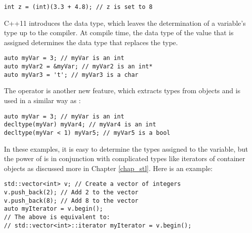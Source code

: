 \noindent\begin{minipage}{\linewidth}\begin{lstlisting}
int z = (int)(3.3 + 4.8); // z is set to 8
\end{lstlisting}\end{minipage}


C++11 introduces the  data type, which leaves the determination of a variable's type up to the compiler. 
At compile time, the data type of the value that is assigned determines the data type that replaces the  type.

\noindent\begin{minipage}{\linewidth}\begin{lstlisting}
auto myVar = 3; // myVar is an int
auto myVar2 = &myVar; // myVar2 is an int*
auto myVar3 = 't'; // myVar3 is a char
\end{lstlisting}\end{minipage}

The  operator is another new feature, which extracts types from objects and is used in a similar way as :

\noindent\begin{minipage}{\linewidth}\begin{lstlisting}
auto myVar = 3; // myVar is an int
decltype(myVar) myVar4; // myVar4 is an int
decltype(myVar < 1) myVar5; // myVar5 is a bool
\end{lstlisting}\end{minipage}

In these examples, it is easy to determine the types assigned to the variable, but the power of  is in conjunction with complicated types like iterators of container objects as discussed more in Chapter \ref{chap_stl}. Here is an example:

\noindent\begin{minipage}{\linewidth}\begin{lstlisting}
std::vector<int> v; // Create a vector of integers
v.push_back(2); // Add 2 to the vector
v.push_back(8); // Add 8 to the vector
auto myIterator = v.begin();
// The above is equivalent to:
// std::vector<int>::iterator myIterator = v.begin();
\end{lstlisting}\end{minipage}


